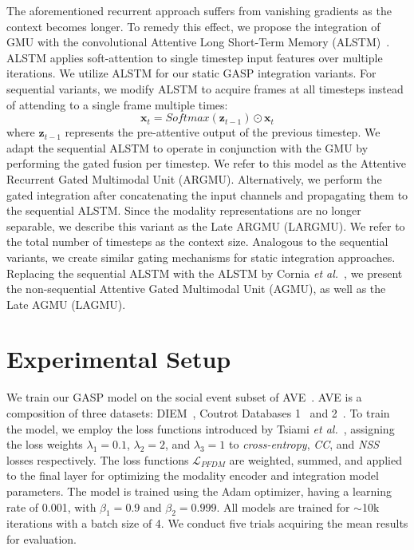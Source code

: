\documentclass{article}
\begin{document}
The aforementioned recurrent approach suffers from vanishing gradients as the context becomes longer. To remedy this effect, we propose the integration of GMU with the convolutional Attentive Long Short-Term Memory (ALSTM)~\cite{cornia2018predicting}. 
ALSTM applies soft-attention to single timestep input features over multiple iterations.
We utilize ALSTM for our static GASP integration variants. For sequential variants, we  modify ALSTM to acquire frames at all timesteps instead of attending to a single frame multiple times:
\begin{equation}
    \label{eq:alstm_atten}
    \mathbf{x}_t = Softmax(\mathbf{z}_{t-1}) \odot \mathbf{x}_t
\end{equation}
where $\mathbf{z}_{t-1}$ represents the pre-attentive output of the previous timestep. We adapt the sequential ALSTM to operate in conjunction with the GMU by performing the gated fusion per timestep. We refer to this model as the Attentive Recurrent Gated Multimodal Unit (ARGMU). Alternatively, we perform the gated integration after concatenating the input channels and propagating them to the sequential ALSTM. Since the modality representations are no longer separable, we describe this variant as the Late ARGMU (LARGMU). We refer to the total number of timesteps as the context size. Analogous to the sequential variants, we create similar gating mechanisms for static integration approaches. Replacing the sequential ALSTM with the ALSTM by Cornia \textit{et al.}~, we present the non-sequential Attentive Gated Multimodal Unit (AGMU), as well as the Late AGMU (LAGMU).

\section{Experimental Setup}
\label{sec:exp}

We train our GASP model on the social event subset of AVE~\cite{tavakoli2020deep}. AVE is a composition of three datasets: DIEM~\cite{mital2011clustering}, Coutrot Databases 1~\cite{coutrot2014audiovisual} and 2~\cite{coutrot2015efficient}.
To train the model, we employ the loss functions introduced by Tsiami \textit{et al.}~, assigning the loss weights $\lambda_1=0.1$, $\lambda_2=2$, and $\lambda_3=1$ to \textit{cross-entropy}, \textit{CC}, and \textit{NSS} losses respectively. The loss functions $ \mathcal{L}_{\!P\!F\!D\!M}$ are weighted, summed, and applied to the final layer for optimizing the modality encoder and integration model parameters. 
The model is trained using the Adam optimizer, having a learning rate of 0.001, with $\beta_1=0.9$ and $\beta_2=0.999$. 
All models are trained for $\sim$10k iterations with a batch size of 4. We conduct five trials acquiring the mean results for evaluation.
\end{document}
